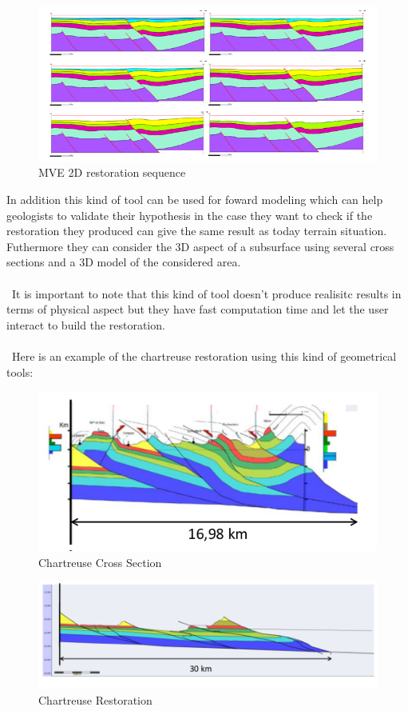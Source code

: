 \documentclass[12pt, a4paper]{memoir} %
\begin{document}
\begin{figure}[H]
	\centering
	\includegraphics[scale=3]{mve2D.png}
	\caption{MVE 2D restoration sequence}
\end{figure}

 In addition this kind of tool can be used for foward modeling which can help geologists to validate their hypothesis in the case they want to check if the restoration they produced can give the same result as today terrain situation. Futhermore they can consider the 3D aspect of a subsurface using several cross sections and a 3D model of the considered area.\\\\\
  It is important to note that this kind of tool doesn't produce realisitc results in terms of physical aspect but they have fast computation time and let the user interact to build the restoration.\\\\\
Here is an example of the chartreuse restoration using this kind of geometrical tools:

\begin{figure}[H]
	\centering
	\includegraphics[scale=0.8]{Wraped_Section.png}
	\caption{Chartreuse Cross Section}
\end{figure}

\begin{figure}[H]
	\centering
	\includegraphics[scale=0.6]{UnWraped_Section.png}
	\caption{Chartreuse Restoration}
\end{figure}
\end{document}
